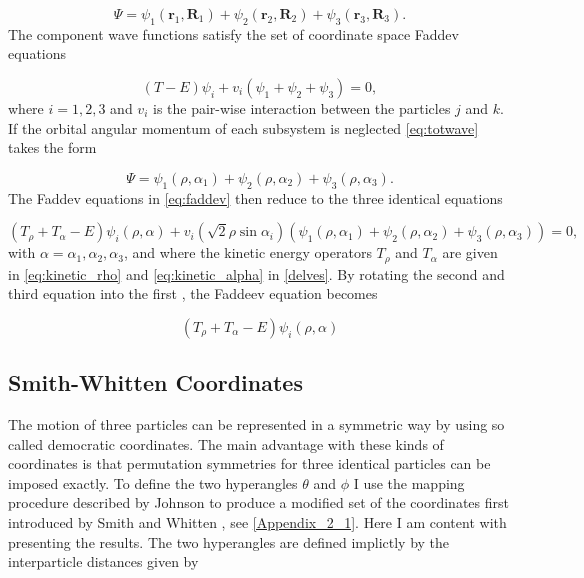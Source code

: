 \begin{equation}\label{eq:totwave}
\Psi = \psi_{1}(\mathbf{r}_1,\mathbf{R}_1)+\psi_{2}(\mathbf{r}_2,\mathbf{R}_2)+\psi_{3}(\mathbf{r}_3,\mathbf{R}_3).
\end{equation}
The component wave functions satisfy the set of coordinate space Faddev equations

\begin{equation}\label{eq:faddev}
(T-E)\psi_{i} + v_i(\psi_{1}+\psi_{2}+\psi_{3}) = 0,
\end{equation}
where $i = 1,2,3$ and $v_i$ is the pair-wise interaction between the particles $j$ and $k$. If the orbital angular momentum of each subsystem is neglected \eqref{eq:totwave} takes the form 

\begin{equation}
\Psi = \psi_{1}(\rho,\alpha_1)+\psi_{2}(\rho,\alpha_2)+\psi_{3}(\rho,\alpha_3).
\end{equation}
The Faddev equations in \eqref{eq:faddev} then reduce to the three identical equations

\begin{equation}
(T_{\rho} + T_{\alpha} -E)\psi_{i}(\rho,\alpha) + v_i(\sqrt{2}\rho\sin \alpha_i)(\psi_{1}(\rho,\alpha_1)+\psi_{2}(\rho,\alpha_2)+\psi_{3}(\rho,\alpha_3)) = 0,
\end{equation}
with $\alpha = \alpha_1,\alpha_2,\alpha_3$, and where the kinetic energy operators $T_{\rho}$ and $T_{\alpha}$ are given in \eqref{eq:kinetic_rho} and \eqref{eq:kinetic_alpha} in \cref{delves}. By rotating the second and third equation into the first \cite{Fedorov1993}, the Faddeev equation becomes

\begin{equation}
(T_{\rho} + T_{\alpha} -E)\psi_{i}(\rho,\alpha)
\end{equation} 

\subsection{Smith-Whitten Coordinates}\label{smith_whitten}
The motion of three particles can be represented in a symmetric way by using so called democratic coordinates. The main advantage with these kinds of coordinates is that permutation symmetries for three identical particles can be imposed exactly. To define the two hyperangles $\theta$ and $\phi$ I use the mapping procedure described by Johnson \cite{Johnson1980} to produce a modified set of the coordinates first introduced by Smith and Whitten \cite{Smith_Whitten1968}, see \cref{Appendix_2_1}. Here I am content with presenting the results. The two hyperangles are defined implictly by the interparticle distances given by 


